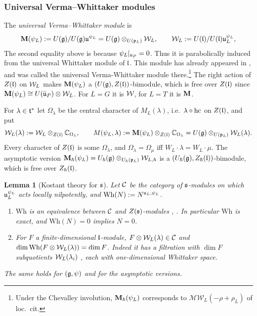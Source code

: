 \documentclass{article}
\theoremstyle{plain}
\newtheorem{lemma}[theorem]{Lemma}
\theoremstyle{definition}
\theoremstyle{remark}
\numberwithin{equation}{section}
\begin{document}
\subsubsection{Universal Verma--Whittaker modules}\label{sec:verma-whittaker}
The \emph{universal Verma--Whittaker module} is
\begin{equation}\label{eq:MpsiL-def}
\mathbf{M}(\psi_L):=U(\mathfrak{g})/U(\mathfrak{g})\mathfrak{u}^{\psi_L}=U(\mathfrak{g})\otimes_{U(\mathfrak{p}_L)}\mathcal{W}_L,\qquad \mathcal{W}_L:=U(\mathfrak{l})/U(\mathfrak{l})\mathfrak{u}_L^{\psi_L},
\end{equation}
The second equality above is because $\psi_L|_{\mathfrak{u}_P}=0$. Thus it is parabolically induced from the universal Whittaker module of $\mathfrak{l}$. This module has already appeared in \cite[\S4.4]{bezrukavnikov2026equivariantsatakecategorykostantwhittaker}, and was called the universal Verma-Whittaker module there.\footnote{Under the Chevalley involution, $\mathbf{M}_\hbar(\psi_L)$ corresponds to $\mathcal{MW}_L(-\rho+\rho_L)$ of loc.\ cit.} The right action of $Z(\mathfrak{l})$ on $\mathcal{W}_L$ makes $\mathbf{M}(\psi_L)$ a $(U(\mathfrak{g}),Z(\mathfrak{l}))$-bimodule, which is free over $Z(\mathfrak{l})$ since $\mathbf{M}(\psi_L)\cong U(\bar{\mathfrak{u}}_P)\otimes\mathcal{W}_L$. For $L=G$ it is $\mathcal{W}$, for $L=T$ it is $\mathbf{M}$.

For $\lambda\in\mathfrak{t}^*$ let $\Omega_\lambda$ be the central character of $M_L(\lambda)$, i.e.\ $\lambda\circ\operatorname{hc}$ on $Z(\mathfrak{l})$, and put
\begin{equation}\label{eq:M-psiL-lambda}
\mathcal{W}_L(\lambda):=\mathcal{W}_L\otimes_{Z(\mathfrak{l})}\mathbb{C}_{\Omega_\lambda},\qquad M(\psi_L,\lambda):=\mathbf{M}(\psi_L)\otimes_{Z(\mathfrak{l})}\mathbb{C}_{\Omega_\lambda}=U(\mathfrak{g})\otimes_{U(\mathfrak{p}_L)}\mathcal{W}_L(\lambda).
\end{equation}
Every character of $Z(\mathfrak{l})$ is some $\Omega_\lambda$, and $\Omega_\lambda=\Omega_\mu$ iff $W_L\cdot\lambda=W_L\cdot\mu$. The asymptotic version $\mathbf{M}_\hbar(\psi_L)=U_\hbar(\mathfrak{g})\otimes_{U_\hbar(\mathfrak{p}_L)}\mathcal{W}_{L,\hbar}$ is a $(U_\hbar(\mathfrak{g}),Z_\hbar(\mathfrak{l}))$-bimodule, which is free over $Z_\hbar(\mathfrak{l})$.

\begin{lemma}[Kostant theory for $\mathfrak{s}$]\label{lem:Kostant-for-s}
Let $\mathcal C$ be the category of $\mathfrak{s}$-modules on which $\mathfrak{u}_L^{\psi_L}$ acts locally nilpotently, and $\mathrm{Wh}(N):=N^{\mathfrak{u}_L,\psi_L}$.
\begin{enumerate}
\item[(K1)] $\mathrm{Wh}$ is an equivalence between $\mathcal C$ and $Z(\mathfrak{s})$-modules \cite[\S\S3--4]{Kostant1978}, \cite{skryabin2002}. In particular $\mathrm{Wh}$ is exact, and $\mathrm{Wh}(N)=0$ implies $N=0$.
\item[(K2)] For $F$ a finite-dimensional $\mathfrak{l}$-module, $F\otimes\mathcal{W}_L(\lambda)\in\mathcal C$ and $\dim\mathrm{Wh}(F\otimes\mathcal{W}_L(\lambda))=\dim F$. Indeed it has a filtration with $\dim F$ subquotients $\mathcal{W}_L(\lambda_i)$ \cite[Theorem 4.6]{Kostant1978}, each with one-dimensional Whittaker space.
\end{enumerate}
The same holds for $(\mathfrak{g},\psi)$ and for the asymptotic versions.
\end{lemma}
\end{document}
